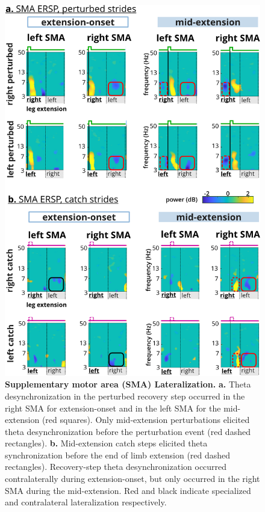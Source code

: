 \documentclass[../thesis_seyed.tex]{subfiles}
\begin{document}
\begin{figure}[!h]
    \centerline{\includegraphics{../img/hyp4- lateraliztion.jpg}}
    \caption{\textbf{Supplementary motor area (SMA) Lateralization.} \textbf{a.} Theta desynchronization in the perturbed recovery step occurred in the right SMA for extension-onset and in the left SMA for the mid-extension (red squares). Only mid-extension perturbations elicited theta desynchronization before the perturbation event (red dashed rectangles). \textbf{b.} Mid-extension catch steps elicited theta synchronization before the end of limb extension (red dashed rectangles). Recovery-step theta desynchronization occurred contralaterally during extension-onset, but only occurred in the right SMA during the mid-extension. Red and black indicate specialized and contralateral lateralization respectively.}
    \label{fig:fig8}
    \end{figure}
\end{document}
